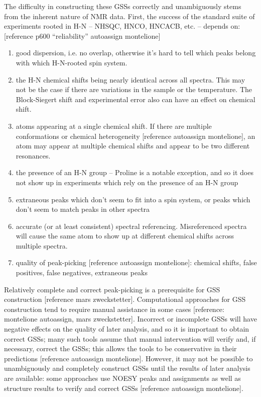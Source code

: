 The difficulty in constructing these GSSs correctly and unambiguously stems 
from the inherent nature of NMR data.  First, the success of the standard 
suite of experiments rooted in H-N -- NHSQC, HNCO, HNCACB, etc. -- depends 
on: [reference p600 “reliability” autoassign montelione]
\begin{enumerate}
  \item good dispersion, i.e. no overlap, otherwise it’s hard to tell which 
  peaks belong with which H-N-rooted spin system.
  \item the H-N chemical shifts being nearly identical across all spectra.  
  This may not be the case if there are variations in the sample or the 
  temperature.  The Block-Siegert shift and experimental error also can have 
  an effect on chemical shift.
  \item atoms appearing at a single chemical shift.  If there are multiple 
  conformations or chemical heterogeneity [reference autoassign montelione], 
  an atom may appear at multiple chemical shifts and appear to be two 
  different resonances.
  \item the presence of an H-N group -- Proline is a notable exception, and 
  so it does not show up in experiments which rely on the presence of an H-N group
  \item extraneous peaks which don’t seem to fit into a spin system, or 
  peaks which don’t seem to match peaks in other spectra
  \item accurate (or at least consistent) spectral referencing.  
  Misreferenced spectra will cause the same atom to show up at different 
  chemical shifts across multiple spectra.
  \item quality of peak-picking [reference autoassign montelione]: 
  chemical shifts, false positives, false negatives, extraneous peaks
\end{enumerate}

Relatively complete and correct peak-picking is a prerequisite for GSS 
construction [reference mars zweckstetter].  Computational approaches 
for GSS construction tend to require manual assistance in some cases 
[reference: montelione autoassign, mars zweckstetter].  Incorrect or 
incomplete GSSs will have negative effects on the quality of later 
analysis, and so it is important to obtain correct GSSs; many such 
tools assume that manual intervention will verify and, if necessary, 
correct the GSSs; this allows the tools to be conservative in their 
predictions [reference autoassign montelione].  However, it may not be 
possible to unambiguously and completely construct GSSs until the results 
of later analysis are available: some approaches use NOESY peaks and 
assignments as well as structure results to verify and correct GSSs 
[reference autoassign montelione].


